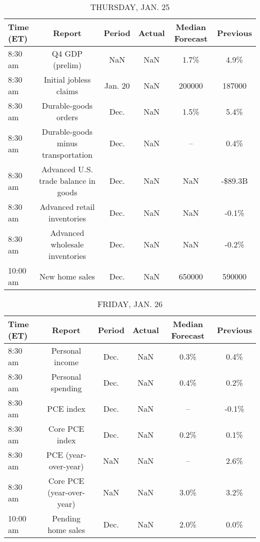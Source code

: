 \documentclass{article}%
\begin{document}
\begin{table}[htbp]%
\caption{THURSDAY, JAN. 25}%
\centering%
\begin{adjustbox}{width=1\textwidth}%
\begin{tabular}{lccccc}
\toprule
Time (ET) &                               Report &  Period & Actual & Median Forecast & Previous \\
\midrule
  8:30 am &                      Q4 GDP (prelim) &     NaN &    NaN &            1.7\% &     4.9\% \\
  8:30 am &               Initial jobless claims & Jan. 20 &    NaN &          200000 &   187000 \\
  8:30 am &                 Durable-goods orders &    Dec. &    NaN &            1.5\% &     5.4\% \\
  8:30 am &   Durable-goods minus transportation &    Dec. &    NaN &              -- &     0.4\% \\
  8:30 am & Advanced U.S. trade balance in goods &    Dec. &    NaN &             NaN &  -\$89.3B \\
  8:30 am &          Advanced retail inventories &    Dec. &    NaN &             NaN &    -0.1\% \\
  8:30 am &       Advanced wholesale inventories &    Dec. &    NaN &             NaN &    -0.2\% \\
 10:00 am &                       New home sales &    Dec. &    NaN &          650000 &   590000 \\
\bottomrule
\end{tabular}
%
\end{adjustbox}%
\end{table}

%


\begin{table}[htbp]%
\caption{FRIDAY, JAN. 26}%
\centering%
\begin{adjustbox}{width=1\textwidth}%
\begin{tabular}{lccccc}
\toprule
Time (ET) &                    Report & Period & Actual & Median Forecast & Previous \\
\midrule
  8:30 am &           Personal income &   Dec. &    NaN &            0.3\% &     0.4\% \\
  8:30 am &         Personal spending &   Dec. &    NaN &            0.4\% &     0.2\% \\
  8:30 am &                 PCE index &   Dec. &    NaN &              -- &    -0.1\% \\
  8:30 am &            Core PCE index &   Dec. &    NaN &            0.2\% &     0.1\% \\
  8:30 am &      PCE (year-over-year) &    NaN &    NaN &              -- &     2.6\% \\
  8:30 am & Core PCE (year-over-year) &    NaN &    NaN &            3.0\% &     3.2\% \\
 10:00 am &        Pending home sales &   Dec. &    NaN &            2.0\% &     0.0\% \\
\bottomrule
\end{tabular}
%
\end{adjustbox}%
\end{table}
\end{document}
